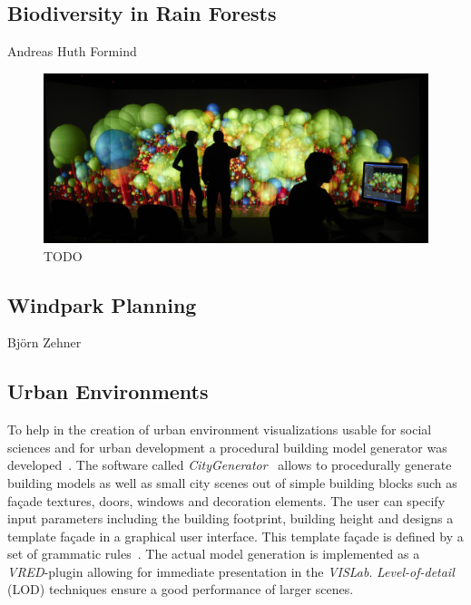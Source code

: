 \documentclass[twocolumn]{svjour3}          %
\begin{document}
\subsection{Biodiversity in Rain Forests}
\label{biodiversity-in-rain-forests}

Andreas Huth Formind \cite{kohler:98}

\begin{figure}
  \includegraphics[width=\linewidth]{images/biodiversity.jpg}
\caption{TODO}
\label{fig:biodiversity}
\end{figure}

\subsection{Windpark Planning}
\label{windpark-planning}

Bj\"orn Zehner \cite{zehner:windpark}

\subsection{Urban Environments}
\label{urban-environments}


To help in the creation of urban environment visualizations usable for social sciences and for urban development a procedural building model generator was developed~\cite{bilke:master,procedural:modelling}. The software called \emph{CityGenerator}~\cite{bilke:citygenerator} allows to procedurally generate building models as well as small city scenes out of simple building blocks such as fa\c{c}ade textures, doors, windows and decoration elements. The user can specify input parameters including the building footprint, building height and designs a template fa\c{c}ade in a graphical user interface. This template fa\c{c}ade is defined by a set of grammatic rules~\cite{procedural:buildings}. The actual model generation is implemented as a \emph{VRED}-plugin allowing for immediate presentation in the \emph{VISLab}. \emph{Level-of-detail} (LOD) techniques ensure a good performance of larger scenes.
\end{document}

